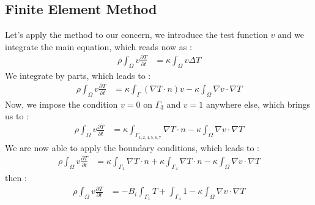 \subsection{Finite Element Method}
Let's apply the method to our concern, we introduce the test function $v$ and we integrate the main equation, which reads now as :
\begin{equation}
   \begin{split}
      \displaystyle{\rho \int_\varOmega v\frac{ \partial T}{\partial t}} & =  \displaystyle{\kappa \int_\varOmega v\Delta T}
  \end{split}
\end{equation}
We integrate by parts, which leads to :
\begin{equation}
   \begin{split}
      \displaystyle{\rho \int_\varOmega v\frac{ \partial T}{\partial t}} & =  \displaystyle{\kappa \int_\Gamma {(\nabla T \cdot n) v} - \kappa \int_\varOmega {\nabla v \cdot \nabla T} }
  \end{split}
\end{equation}
Now, we impose the condition $v=0$ on $\Gamma_3$ and $v=1$ anywhere else, which brings us to :
\begin{equation}
   \begin{split}
      \displaystyle{\rho \int_\varOmega v\frac{ \partial T}{\partial t}} & =  \displaystyle{\kappa \int_{\Gamma_{1,2,4,5,6,7}} {\nabla T \cdot n} - 
		\kappa \int_\varOmega {\nabla v \cdot \nabla T} }
  \end{split}
\end{equation}
We are now able to apply the boundary conditions, which leads to :
\begin{equation}
   \begin{split}
      \displaystyle{\rho \int_\varOmega v\frac{ \partial T}{\partial t}} & =  \displaystyle{\kappa \int_{\Gamma_1}{\nabla T \cdot n} + \kappa \int_{\Gamma_4} {\nabla T \cdot n}
           - \kappa \int_\varOmega {\nabla v \cdot \nabla T} }
  \end{split}
\end{equation}
then :
\begin{equation}
   \begin{split}
      \displaystyle{\rho \int_\varOmega v\frac{ \partial T}{\partial t}} & =  \displaystyle{- B_i \int_{\Gamma_1}{T} + \int_{\Gamma_4}{1}
           - \kappa \int_\varOmega {\nabla v \cdot \nabla T} }
  \end{split}
\end{equation}

